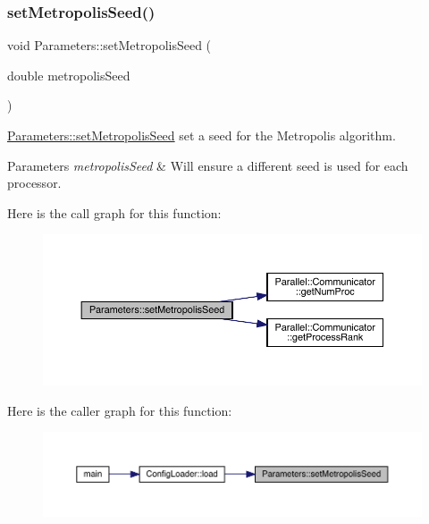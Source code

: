 \subsubsection{\texorpdfstring{setMetropolisSeed()}{setMetropolisSeed()}}
{\footnotesize\ttfamily void Parameters\+::set\+Metropolis\+Seed (\begin{DoxyParamCaption}\item[{double}]{metropolis\+Seed }\end{DoxyParamCaption})\hspace{0.3cm}{\ttfamily [static]}}



\mbox{\hyperlink{class_parameters_ace3967a0ee49901f55e9de69e0a96117}{Parameters\+::set\+Metropolis\+Seed}} set a seed for the Metropolis algorithm. 


\begin{DoxyParams}{Parameters}
{\em metropolis\+Seed} & Will ensure a different seed is used for each processor. \\
\hline
\end{DoxyParams}
Here is the call graph for this function\+:\nopagebreak
\begin{figure}[H]
\begin{center}
\leavevmode
\includegraphics[width=350pt]{class_parameters_ace3967a0ee49901f55e9de69e0a96117_cgraph}
\end{center}
\end{figure}
Here is the caller graph for this function\+:\nopagebreak
\begin{figure}[H]
\begin{center}
\leavevmode
\includegraphics[width=350pt]{class_parameters_ace3967a0ee49901f55e9de69e0a96117_icgraph}
\end{center}
\end{figure}
\mbox{\label{class_parameters_a0e0118ebbe8f19148a5c6d737c7a2c85}} 
